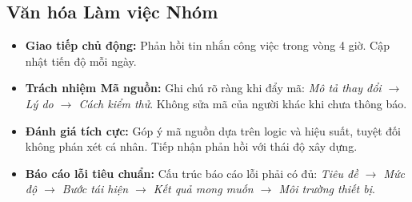 \documentclass[12pt,a4paper]{article}
\begin{document}
\subsection{Văn hóa Làm việc Nhóm}
\begin{itemize}[leftmargin=*]
    \item \textbf{Giao tiếp chủ động:} Phản hồi tin nhắn công việc trong vòng 4 giờ. Cập nhật tiến độ mỗi ngày.
    \item \textbf{Trách nhiệm Mã nguồn:} Ghi chú rõ ràng khi đẩy mã: \textit{Mô tả thay đổi $\rightarrow$ Lý do $\rightarrow$ Cách kiểm thử}. Không sửa mã của người khác khi chưa thông báo.
    \item \textbf{Đánh giá tích cực:} Góp ý mã nguồn dựa trên logic và hiệu suất, tuyệt đối không phán xét cá nhân. Tiếp nhận phản hồi với thái độ xây dựng.
    \item \textbf{Báo cáo lỗi tiêu chuẩn:} Cấu trúc báo cáo lỗi phải có đủ: \textit{Tiêu đề $\rightarrow$ Mức độ $\rightarrow$ Bước tái hiện $\rightarrow$ Kết quả mong muốn $\rightarrow$ Môi trường thiết bị}.
\end{itemize}

\label{LastPageToolsAndSkills}
\end{document}
